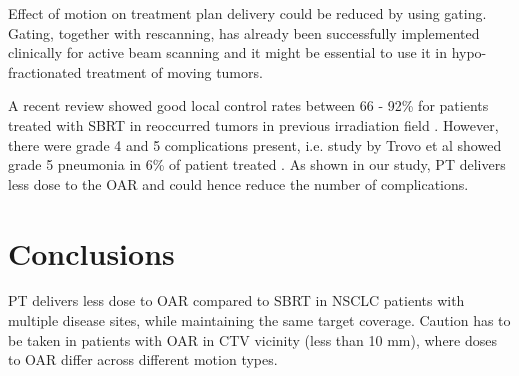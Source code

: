 \documentclass[type=dr, dr=rernat, accentcolor=tud7b,colorbacktitle, bigchapter, openright, twoside, 12pt ]{tudthesis}
\begin{document}
Effect of motion on treatment plan delivery could be reduced by using gating. Gating, together with rescanning, has already been successfully implemented clinically for active beam scanning \cite{Rossi2016, Mori2016} and it might be essential to use it in hypo-fractionated 
treatment of moving tumors.

A recent review showed good local control rates between 66 - 92\% for patients treated with SBRT in reoccurred tumors in previous irradiation field \cite{Amini2014}. 
However, there were grade 4 and 5 complications present, i.e. study by Trovo et al showed grade 5 pneumonia in
6\% of patient treated \cite{Trovo2014}. As shown in our study, PT delivers less dose to the OAR and could hence reduce the number of complications.

\section{Conclusions}

PT delivers less dose to OAR compared to SBRT in NSCLC patients with multiple disease sites, while maintaining the same target coverage. Caution has to be taken in patients with OAR in CTV vicinity (less than 10 mm), where doses to OAR differ across different motion types.





{}
% 
\end{document}
